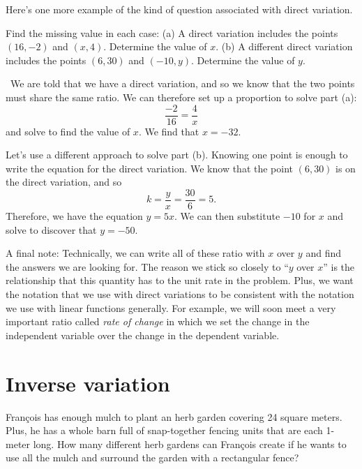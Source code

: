 Here's one more example of the kind of question associated with direct variation.

\begin{boxex}
Find the missing value in each case: (a) A direct variation includes the points $(16, -2)$ and $(x, 4)$. Determine the value of $x$. (b) A different direct variation includes the points $(6, 30)$ and $(-10, y)$. Determine the value of $y$.

\exsoln\ We are told that we have a direct variation, and so we know that the two points must share the same ratio. We can therefore set up a proportion to solve part (a):
\[\frac{-2}{16} = \frac{4}{x}\] and solve to find the value of $x$. We find that $x=-32$.

Let's use a different approach to solve part (b). Knowing one point is enough to write the equation for the direct variation. We know that the point $(6,30)$ is on the direct variation, and so \[k = \frac{y}{x} = \frac{30}{6} = 5.\] Therefore, we have the equation $y = 5x$. We can then substitute $-10$ for $x$ and solve to discover that $y=-50$.
\end{boxex}

A final note: Technically, we can write all of these ratio with $x$ over $y$ and find the answers we are looking for. The reason we stick so closely to ``$y$ over $x$'' is the relationship that this quantity has to the unit rate in the problem. Plus, we want the notation that we use with direct variations to be consistent with the notation we use with linear functions generally. For example, we will soon meet a very important ratio called \textit{rate of change} in which we set the change in the independent variable over the change in the dependent variable.


\section{Inverse variation}
\label{sec:inversevar}


\begin{boxexplore}
Fran\c{c}ois has enough mulch to plant an herb garden covering 24 square meters. Plus, he has a whole barn full of snap-together fencing units that are each 1-meter long. How many different herb gardens can Fran\c{c}ois create if he wants to use all the mulch and surround the garden with a rectangular fence?
\end{boxexplore} %


